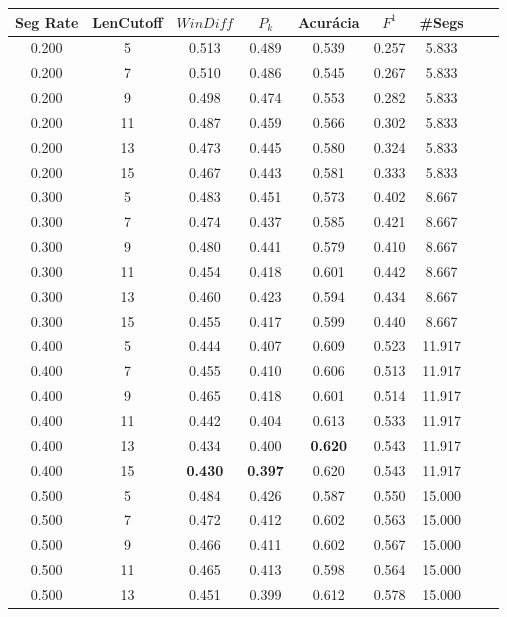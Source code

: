 \documentclass{article}
\begin{document}
\begin{longtable}[c]{|c|c|c|c|c|c|c|c|c|} 
\hline 
 Seg Rate & LenCutoff & $WinDiff$ & $P_k$ & Acurácia & $F^1$ & \#Segs\\ \hline 
 0.200 & 5 & 0.513 & 0.489 & 0.539 & 0.257 & 5.833  \\ \hline 
 0.200 & 7 & 0.510 & 0.486 & 0.545 & 0.267 & 5.833  \\ \hline 
 0.200 & 9 & 0.498 & 0.474 & 0.553 & 0.282 & 5.833  \\ \hline 
 0.200 & 11 & 0.487 & 0.459 & 0.566 & 0.302 & 5.833  \\ \hline 
 0.200 & 13 & 0.473 & 0.445 & 0.580 & 0.324 & 5.833  \\ \hline 
 0.200 & 15 & 0.467 & 0.443 & 0.581 & 0.333 & 5.833  \\ \hline 
 0.300 & 5 & 0.483 & 0.451 & 0.573 & 0.402 & 8.667  \\ \hline 
 0.300 & 7 & 0.474 & 0.437 & 0.585 & 0.421 & 8.667  \\ \hline 
 0.300 & 9 & 0.480 & 0.441 & 0.579 & 0.410 & 8.667  \\ \hline 
 0.300 & 11 & 0.454 & 0.418 & 0.601 & 0.442 & 8.667  \\ \hline 
 0.300 & 13 & 0.460 & 0.423 & 0.594 & 0.434 & 8.667  \\ \hline 
 0.300 & 15 & 0.455 & 0.417 & 0.599 & 0.440 & 8.667  \\ \hline 
 0.400 & 5 & 0.444 & 0.407 & 0.609 & 0.523 & 11.917  \\ \hline 
 0.400 & 7 & 0.455 & 0.410 & 0.606 & 0.513 & 11.917  \\ \hline 
 0.400 & 9 & 0.465 & 0.418 & 0.601 & 0.514 & 11.917  \\ \hline 
 0.400 & 11 & 0.442 & 0.404 & 0.613 & 0.533 & 11.917  \\ \hline 
 0.400 & 13 & 0.434 & 0.400 & \cellcolor{gray!20} \textbf{0.620} & 0.543 & 11.917  \\ \hline 
 0.400 & 15 & \cellcolor{gray!20} \textbf{0.430} & \cellcolor{gray!20} \textbf{0.397} & 0.620 & 0.543 & 11.917  \\ \hline 
 0.500 & 5 & 0.484 & 0.426 & 0.587 & 0.550 & 15.000  \\ \hline 
 0.500 & 7 & 0.472 & 0.412 & 0.602 & 0.563 & 15.000  \\ \hline 
 0.500 & 9 & 0.466 & 0.411 & 0.602 & 0.567 & 15.000  \\ \hline 
 0.500 & 11 & 0.465 & 0.413 & 0.598 & 0.564 & 15.000  \\ \hline 
 0.500 & 13 & 0.451 & 0.399 & 0.612 & 0.578 & 15.000  \\ \hline 

\end{longtable}
\end{document}
